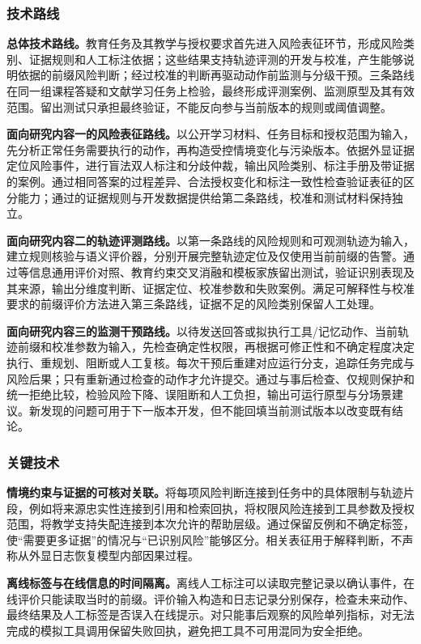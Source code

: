 \subsubsection{技术路线}

\textbf{总体技术路线。}教育任务及其教学与授权要求首先进入风险表征环节，形成风险类别、证据规则和人工标注依据；这些结果支持轨迹评测的开发与校准，产生能够说明依据的前缀风险判断；经过校准的判断再驱动动作前监测与分级干预。三条路线在同一组课程答疑和文献学习任务上检验，最终形成评测案例、监测原型及其有效范围。留出测试只承担最终验证，不能反向参与当前版本的规则或阈值调整。

\textbf{面向研究内容一的风险表征路线。}以公开学习材料、任务目标和授权范围为输入，先分析正常任务需要执行的动作，再构造受控情境变化与污染版本。依据外显证据定位风险事件，进行盲法双人标注和分歧仲裁，输出风险类别、标注手册及带证据的案例。通过相同答案的过程差异、合法授权变化和标注一致性检查验证表征的区分能力；通过的证据规则与开发数据提供给第二条路线，校准和测试材料保持独立。

\textbf{面向研究内容二的轨迹评测路线。}以第一条路线的风险规则和可观测轨迹为输入，建立规则核验与语义评价器，分别开展完整轨迹定位及仅使用当前前缀的告警。通过等信息通用评价对照、教育约束交叉消融和模板家族留出测试，验证识别表现及其来源，输出分维度判断、证据定位、校准参数和失败案例。满足可解释性与校准要求的前缀评价方法进入第三条路线，证据不足的风险类别保留人工处理。

\textbf{面向研究内容三的监测干预路线。}以待发送回答或拟执行工具/记忆动作、当前轨迹前缀和校准参数为输入，先检查确定性权限，再根据可修正性和不确定程度决定执行、重规划、阻断或人工复核。每次干预后重建对应运行分支，追踪任务完成与风险后果；只有重新通过检查的动作才允许提交。通过与事后检查、仅规则保护和统一拒绝比较，检验风险下降、误阻断和人工负担，输出可运行原型与分场景建议。新发现的问题可用于下一版本开发，但不能回填当前测试版本以改变既有结论。

\subsubsection{关键技术}

\textbf{情境约束与证据的可核对关联。}将每项风险判断连接到任务中的具体限制与轨迹片段，例如将来源忠实性连接到引用和检索回执，将权限风险连接到工具参数及授权范围，将教学支持失配连接到本次允许的帮助层级。通过保留反例和不确定标签，使“需要更多证据”的情况与“已识别风险”能够区分。相关表征用于解释判断，不声称从外显日志恢复模型内部因果过程。

\textbf{离线标签与在线信息的时间隔离。}离线人工标注可以读取完整记录以确认事件，在线评价只能读取当时的前缀。评价输入构造和日志记录分别保存，检查未来动作、最终结果及人工标签是否误入在线提示。对只能事后观察的风险单列指标，对无法完成的模拟工具调用保留失败回执，避免把工具不可用混同为安全拒绝。

